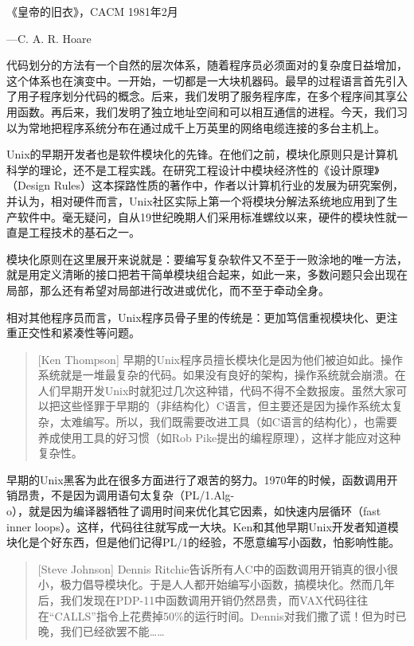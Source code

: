 \documentclass[12pt,oneside]{book}
\begin{document}
\begin{common-format}
\begin{flushright}
\begin{notecard}{30em}
{\hfill 《皇帝的旧衣》，CACM 1981年2月}

{\hfill —C. A. R. Hoare}
\end{notecard}
\end{flushright}

代码划分的方法有一个自然的层次体系，随着程序员必须面对的复杂度日益增加，这个体系也在演变中。一开始，一切都是一大块机器码。最早的过程语言首先引入了用子程序划分代码的概念。后来，我们发明了服务程序库，在多个程序间其享公用函数。再后来，我们发明了独立地址空间和可以相互通信的进程。今天，我们习以为常地把程序系统分布在通过成千上万英里的网络电缆连接的多台主机上。

Unix的早期开发者也是软件模块化的先锋。在他们之前，模块化原则只是计算机科学的理论，还不是工程实践。在研究工程设计中模块经济性的《设计原理》（Design Rules）\cite{Baldwin-Clark}这本探路性质的著作中，作者以计算机行业的发展为研究案例，并认为，相对硬件而言，Unix社区实际上第一个将模块分解法系统地应用到了生产软件中。毫无疑问，自从19世纪晚期人们采用标准螺纹以来，硬件的模块性就一直是工程技术的基石之一。

模块化原则在这里展开来说就是：要编写复杂软件又不至于一败涂地的唯一方法，就是用定义清晰的接口把若干简单模块组合起来，如此一来，多数问题只会出现在局部，那么还有希望对局部进行改进或优化，而不至于牵动全身。

相对其他程序员而言，Unix程序员骨子里的传统是：更加笃信重视模块化、更注重正交性和紧凑性等问题。
\begin{quote}[Ken Thompson]
早期的Unix程序员擅长模块化是因为他们被迫如此。操作系统就是一堆最复杂的代码。如果没有良好的架构，操作系统就会崩溃。在人们早期开发Unix时就犯过几次这种错，代码不得不全数报废。虽然大家可以把这些怪罪于早期的（非结构化）C语言，但主要还是因为操作系统太复杂，太难编写。所以，我们既需要改进工具（如C语言的结构化），也需要养成使用工具的好习惯（如Rob Pike提出的编程原理），这样才能应对这种复杂性。
\end{quote}

早期的Unix黑客为此在很多方面进行了艰苦的努力。1970年的时候，函数调用开销昂贵，不是因为调用语句太复杂（PL/1.Alg-\\o），就是因为编译器牺牲了调用时间来优化其它因素，如快速内层循环（fast inner loops）。这样，代码往往就写成一大块。Ken和其他早期Unix开发者知道模块化是个好东西，但是他们记得PL/1的经验，不愿意编写小函数，怕影响性能。
\begin{quote}[Steve Johnson]
Dennis Ritchie告诉所有人C中的函数调用开销真的很小很小，极力倡导模块化。于是人人都开始编写小函数，搞模块化。然而几年后，我们发现在PDP-11中函数调用开销仍然昂贵，而VAX代码往往在“CALLS”指令上花费掉50\%的运行时间。Dennis对我们撒了谎！但为时已晚，我们已经欲罢不能……
\end{quote}


\end{common-format}
\end{document}
